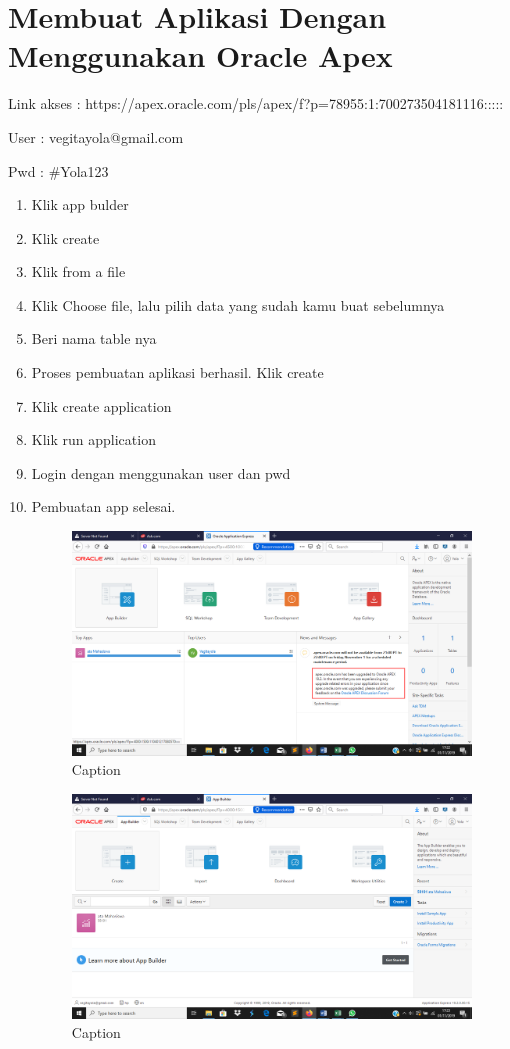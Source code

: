 \section{Membuat Aplikasi Dengan Menggunakan Oracle Apex}
 Link akses : https://apex.oracle.com/pls/apex/f?p=78955:1:700273504181116::::: \par
\par User : vegitayola@gmail.com \par Pwd : #Yola123
\begin{enumerate}
\item Klik app bulder

\item Klik create
\item Klik from a file
\item Klik Choose file, lalu pilih data yang sudah kamu buat sebelumnya

\item Beri nama table nya
\item Proses pembuatan aplikasi berhasil. Klik create
\item Klik create application
\item Klik run application
\item Login dengan menggunakan user dan pwd
\item Pembuatan app selesai.
\begin{figure}[!htbp]
    \centering
    \includegraphics[scale=0.3]{figure/10.png}
    \caption{Caption}
    \label{fig:my_label}
\end{figure}

\begin{figure}[!htbp]
    \centering
    \includegraphics[scale=0.3]{figure/11.png}
    \caption{Caption}
    \label{fig:my_label}
\end{figure}


\end{enumerate}
